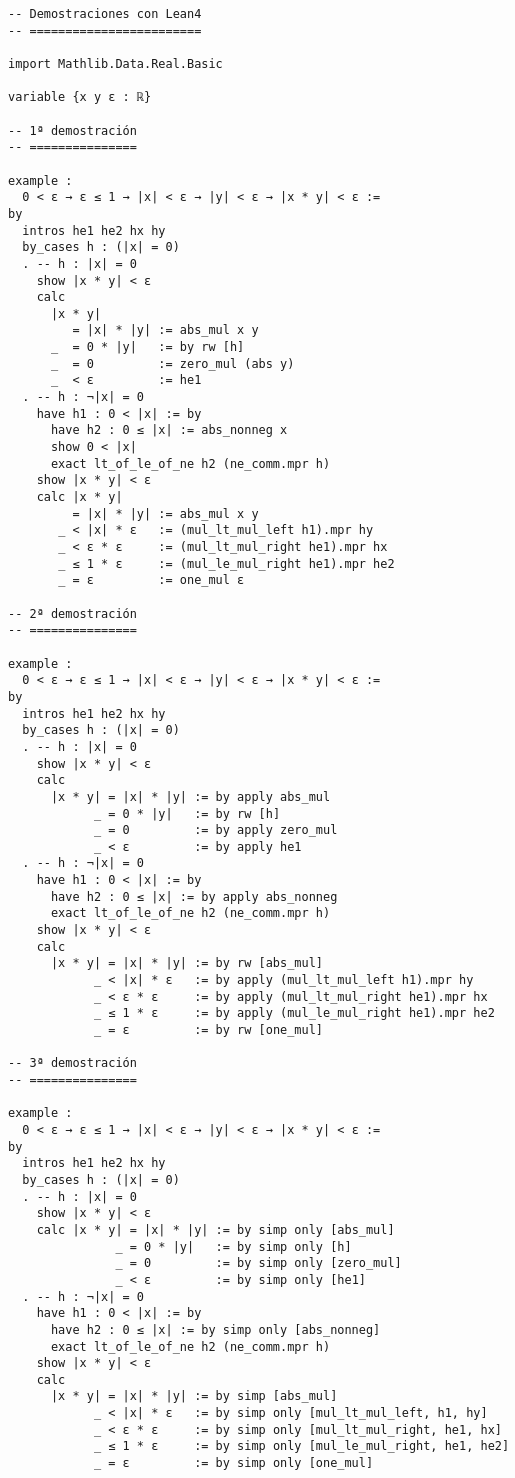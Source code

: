 \begin{verbatim}
-- Demostraciones con Lean4
-- ========================

import Mathlib.Data.Real.Basic

variable {x y ε : ℝ}

-- 1ª demostración
-- ===============

example :
  0 < ε → ε ≤ 1 → |x| < ε → |y| < ε → |x * y| < ε :=
by
  intros he1 he2 hx hy
  by_cases h : (|x| = 0)
  . -- h : |x| = 0
    show |x * y| < ε
    calc
      |x * y|
         = |x| * |y| := abs_mul x y
      _  = 0 * |y|   := by rw [h]
      _  = 0         := zero_mul (abs y)
      _  < ε         := he1
  . -- h : ¬|x| = 0
    have h1 : 0 < |x| := by
      have h2 : 0 ≤ |x| := abs_nonneg x
      show 0 < |x|
      exact lt_of_le_of_ne h2 (ne_comm.mpr h)
    show |x * y| < ε
    calc |x * y|
         = |x| * |y| := abs_mul x y
       _ < |x| * ε   := (mul_lt_mul_left h1).mpr hy
       _ < ε * ε     := (mul_lt_mul_right he1).mpr hx
       _ ≤ 1 * ε     := (mul_le_mul_right he1).mpr he2
       _ = ε         := one_mul ε

-- 2ª demostración
-- ===============

example :
  0 < ε → ε ≤ 1 → |x| < ε → |y| < ε → |x * y| < ε :=
by
  intros he1 he2 hx hy
  by_cases h : (|x| = 0)
  . -- h : |x| = 0
    show |x * y| < ε
    calc
      |x * y| = |x| * |y| := by apply abs_mul
            _ = 0 * |y|   := by rw [h]
            _ = 0         := by apply zero_mul
            _ < ε         := by apply he1
  . -- h : ¬|x| = 0
    have h1 : 0 < |x| := by
      have h2 : 0 ≤ |x| := by apply abs_nonneg
      exact lt_of_le_of_ne h2 (ne_comm.mpr h)
    show |x * y| < ε
    calc
      |x * y| = |x| * |y| := by rw [abs_mul]
            _ < |x| * ε   := by apply (mul_lt_mul_left h1).mpr hy
            _ < ε * ε     := by apply (mul_lt_mul_right he1).mpr hx
            _ ≤ 1 * ε     := by apply (mul_le_mul_right he1).mpr he2
            _ = ε         := by rw [one_mul]

-- 3ª demostración
-- ===============

example :
  0 < ε → ε ≤ 1 → |x| < ε → |y| < ε → |x * y| < ε :=
by
  intros he1 he2 hx hy
  by_cases h : (|x| = 0)
  . -- h : |x| = 0
    show |x * y| < ε
    calc |x * y| = |x| * |y| := by simp only [abs_mul]
               _ = 0 * |y|   := by simp only [h]
               _ = 0         := by simp only [zero_mul]
               _ < ε         := by simp only [he1]
  . -- h : ¬|x| = 0
    have h1 : 0 < |x| := by
      have h2 : 0 ≤ |x| := by simp only [abs_nonneg]
      exact lt_of_le_of_ne h2 (ne_comm.mpr h)
    show |x * y| < ε
    calc
      |x * y| = |x| * |y| := by simp [abs_mul]
            _ < |x| * ε   := by simp only [mul_lt_mul_left, h1, hy]
            _ < ε * ε     := by simp only [mul_lt_mul_right, he1, hx]
            _ ≤ 1 * ε     := by simp only [mul_le_mul_right, he1, he2]
            _ = ε         := by simp only [one_mul]


\end{verbatim}
